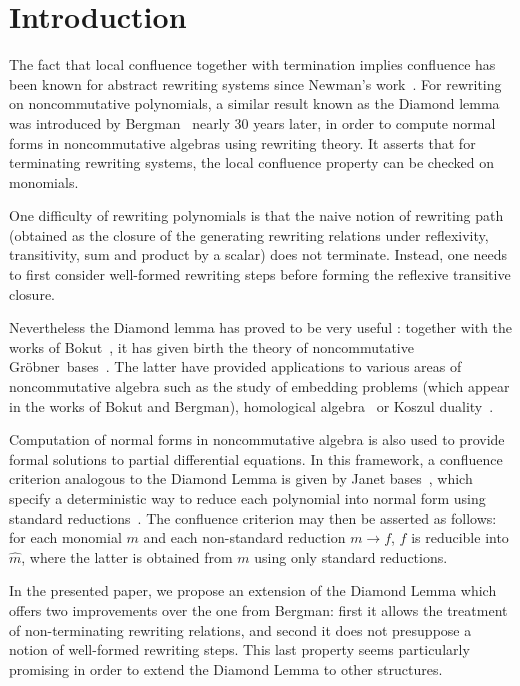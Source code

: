 \documentclass[10pt]{easychair}
\theoremstyle{definition}
\newcommand\secUn{Introduction}
\newcommand\G{Gröbner}
\begin{document}
\section{\secUn}

The fact that local confluence together with termination implies
confluence has been known for abstract rewriting systems since
Newman's work~\cite{MR0007372}. For rewriting on noncommutative
polynomials, a similar result known as the Diamond lemma was
introduced by Bergman~\cite{MR506890} nearly 30 years later, in order
to compute normal forms in noncommutative algebras using rewriting
theory. It asserts that for terminating rewriting systems, the local
confluence property can be checked on monomials.

One difficulty of rewriting polynomials is that the naive notion of
rewriting path (obtained as the closure of the generating rewriting
relations under reflexivity, transitivity, sum and product by a
scalar) does not terminate. Instead, one needs to first consider
well-formed rewriting steps before forming the reflexive transitive
closure.

Nevertheless the Diamond lemma has proved to be very useful : together
with the works of Bokut~\cite{MR0506423}, it has given birth the
theory of noncommutative \G\ bases~\cite{MR1299371}. The latter have
provided applications to various areas of noncommutative algebra such
as the study of embedding problems (which appear in the works of Bokut
and Bergman), homological algebra~\cite{MR1072284, MR2110434} or
Koszul duality~\cite{MR1832913, MR0265437}.

Computation of normal forms in noncommutative algebra is also used to
provide formal solutions to partial differential equations. In this
framework, a confluence criterion analogous to the Diamond Lemma is
given by Janet bases~\cite{MR2394773}, which specify a deterministic
way to reduce each polynomial into normal form using standard
reductions~\cite{Mell}. The confluence criterion may then be asserted
as follows: for each monomial $m$ and each non-standard reduction
$m\to f$, $f$ is reducible into $\widehat{m}$, where the latter is
obtained from $m$ using only standard reductions.

In the presented paper, we propose an extension of the Diamond Lemma
which offers two improvements over the one from Bergman: first it
allows the treatment of non-terminating rewriting relations, and
second it does not presuppose a notion of well-formed rewriting
steps. This last property seems particularly promising in order to
extend the Diamond Lemma to other structures.
\end{document}
